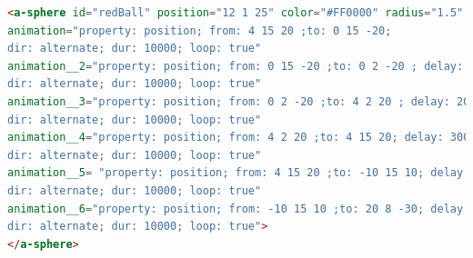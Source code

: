 \begin{lstlisting}[language=html]
<a-sphere id="redBall" position="12 1 25" color="#FF0000" radius="1.5" 
animation="property: position; from: 4 15 20 ;to: 0 15 -20; 
dir: alternate; dur: 10000; loop: true"
animation__2="property: position; from: 0 15 -20 ;to: 0 2 -20 ; delay: 10000; 
dir: alternate; dur: 10000; loop: true"
animation__3="property: position; from: 0 2 -20 ;to: 4 2 20 ; delay: 20000; 
dir: alternate; dur: 10000; loop: true" 
animation__4="property: position; from: 4 2 20 ;to: 4 15 20; delay: 30000; 
dir: alternate; dur: 10000; loop: true"
animation__5= "property: position; from: 4 15 20 ;to: -10 15 10; delay: 40000;
dir: alternate; dur: 10000; loop: true"
animation__6="property: position; from: -10 15 10 ;to: 20 8 -30; delay: 50000; 
dir: alternate; dur: 10000; loop: true">
</a-sphere>
\end{lstlisting}

